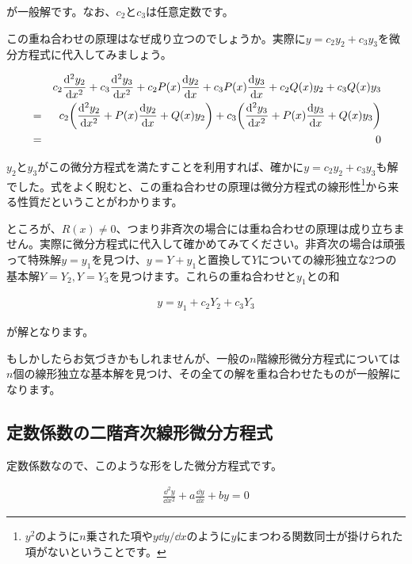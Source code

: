 \noindent
が一般解です。なお、$c_2$と$c_3$は任意定数です。

この重ね合わせの原理はなぜ成り立つのでしょうか。実際に$y=c_2y_2+c_3y_3$を微分方程式に代入してみましょう。

\begin{eqnarray}
    &&c_2\frac{\dd^2y_2}{\dd x^2}+c_3\frac{\dd^2y_3}{\dd x^2}+c_2P(x)\frac{\dd y_2}{\dd x}+c_3P(x)\frac{\dd y_3}{\dd x}+c_2Q(x)y_2+c_3Q(x)y_3 \nonumber\\
    &=&c_2\pqty{\frac{\dd^2y_2}{\dd x^2}+P(x)\frac{\dd y_2}{\dd x}+Q(x)y_2}+c_3\pqty{\frac{\dd^2y_3}{\dd x^2}+P(x)\frac{\dd y_3}{\dd x}+Q(x)y_3} \nonumber\\
    &=&0 \nonumber
\end{eqnarray}

$y_2$と$y_3$がこの微分方程式を満たすことを利用すれば、確かに$y=c_2y_2+c_3y_3$も解でした。式をよく睨むと、この重ね合わせの原理は微分方程式の線形性\footnote{$y^2$のように$n$乗された項や$y\dd y/\dd x$のように$y$にまつわる関数同士が掛けられた項がないということです。}から来る性質だということがわかります。

ところが、$R(x)\neq0$、つまり非斉次の場合には重ね合わせの原理は成り立ちません。実際に微分方程式に代入して確かめてみてください。非斉次の場合は頑張って特殊解$y=y_1$を見つけ、$y=Y+y_1$と置換して$Y$についての線形独立な2つの基本解$Y=Y_2, Y=Y_3$を見つけます。これらの重ね合わせと$y_1$との和

\begin{eqnarray}
    y=y_1+c_2Y_2+c_3Y_3
\end{eqnarray}

\noindent
が解となります。

もしかしたらお気づきかもしれませんが、一般の$n$階線形微分方程式については$n$個の線形独立な基本解を見つけ、その全ての解を重ね合わせたものが一般解になります。







\subsection{定数係数の二階斉次線形微分方程式}
\label{second-order-const}
定数係数なので、このような形をした微分方程式です。

\begin{eqnarray}
    \frac{\dd^2y}{\dd x^2}+a\frac{\dd y}{\dd x}+by=0
    \label{eq:second-order-const}
\end{eqnarray}

